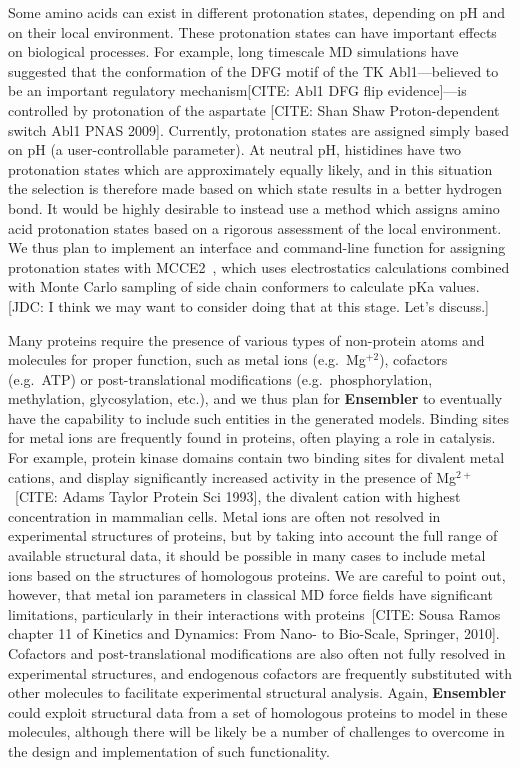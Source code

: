 \documentclass[aps,pre,twocolumn,nofootinbib,superscriptaddress,linenumbers]{revtex4-1}
\begin{document}
Some amino acids can exist in different protonation states, depending on pH and on their local environment.
These protonation states can have important effects on biological processes.
For example, long timescale MD simulations have suggested that the conformation of the DFG motif of the TK Abl1---believed to be an important regulatory mechanism[CITE: Abl1 DFG flip evidence]---is controlled by protonation of the aspartate [CITE: Shan Shaw Proton-dependent switch Abl1 PNAS 2009].
Currently, protonation states are assigned simply based on pH (a user-controllable parameter).
At neutral pH, histidines have two protonation states which are approximately equally likely, and in this situation the selection is therefore made based on which state results in a better hydrogen bond.
It would be highly desirable to instead use a method which assigns amino acid protonation states based on a rigorous assessment of the local environment.
We thus plan to implement an interface and command-line function for assigning protonation states with MCCE2~\cite{alexov-gunner:biophys-j:1997:mcce2,georgescu-alexov-gunner:biophys-j:2002:mcce2,song-mao-gunner:j-comput-chem:2009:mcce2}, which uses electrostatics calculations combined with Monte Carlo sampling of side chain conformers to calculate pKa values.
{\color{red}[JDC: I think we may want to consider doing that at this stage.  Let's discuss.]}

Many proteins require the presence of various types of non-protein atoms and molecules for proper function, such as metal ions (e.g.~Mg$^{+2}$), cofactors (e.g.~ATP) or post-translational modifications (e.g.~phosphorylation, methylation, glycosylation, etc.), and we thus plan for {\bf Ensembler} to eventually have the capability to include such entities in the generated models.
Binding sites for metal ions are frequently found in proteins, often playing a role in catalysis.
For example, protein kinase domains contain two binding sites for divalent metal cations, and display significantly increased activity in the presence of Mg$^{2+}$~[CITE: Adams Taylor Protein Sci 1993], the divalent cation with highest concentration in mammalian cells.
Metal ions are often not resolved in experimental structures of proteins, but by taking into account the full range of available structural data, it should be possible in many cases to include metal ions based on the structures of homologous proteins.
We are careful to point out, however, that metal ion parameters in classical MD force fields have significant limitations, particularly in their interactions with proteins~[CITE: Sousa Ramos chapter 11 of Kinetics and Dynamics: From Nano- to Bio-Scale, Springer, 2010].
Cofactors and post-translational modifications are also often not fully resolved in experimental structures, and endogenous cofactors are frequently substituted with other molecules to facilitate experimental structural analysis.
Again, {\bf Ensembler} could exploit structural data from a set of homologous proteins to model in these molecules, although there will be likely be a number of challenges to overcome in the design and implementation of such functionality.
\end{document}

